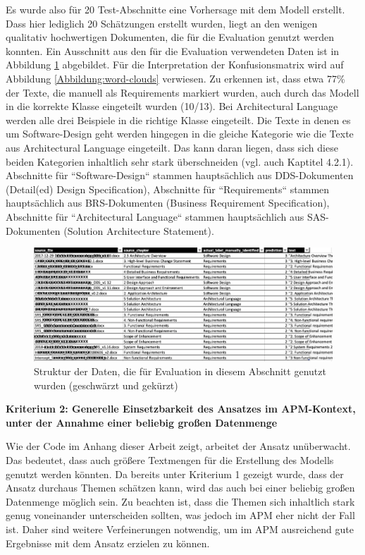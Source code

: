 Es wurde also für 20 Test-Abschnitte eine Vorhersage mit dem Modell erstellt. Dass hier lediglich 20 Schätzungen erstellt wurden, liegt an den wenigen qualitativ hochwertigen Dokumenten, die für die Evaluation genutzt werden konnten. Ein Ausschnitt aus den für die Evaluation verwendeten Daten ist in Abbildung \ref{Abbildung:test-setup} abgebildet. Für die Interpretation der Konfusionsmatrix wird auf Abbildung \ref{Abbildung:word-clouds} verwiesen. Zu erkennen ist, dass etwa 77\% der Texte, die manuell als Requirements markiert wurden, auch durch das Modell in die korrekte Klasse eingeteilt wurden (10/13). Bei Architectural Language werden alle drei Beispiele in die richtige Klasse eingeteilt. Die Texte in denen es um Software-Design geht werden hingegen in die gleiche Kategorie wie die Texte aus Architectural Language eingeteilt. Das kann daran liegen, dass sich diese beiden Kategorien inhaltlich sehr stark überschneiden (vgl. auch Kaptitel 4.2.1). Abschnitte für ``Software-Design`` stammen hauptsächlich aus DDS-Dokumenten (Detail(ed) Design Specification), Abschnitte für ``Requirements`` stammen hauptsächlich aus BRS-Dokumenten (Business Requirement Specification), Abschnitte für ``Architectural Language`` stammen hauptsächlich aus SAS-Dokumenten (Solution Architecture Statement). 

\begin{figure}[h]
\centering
\includegraphics[scale=0.95]{content/pics/Picture_20.png}
\caption{Struktur der Daten, die für Evaluation in diesem Abschnitt genutzt wurden (geschwärzt und gekürzt)}
\label{Abbildung:test-setup}
\end{figure}

{\bf Kriterium 2: Generelle Einsetzbarkeit des Ansatzes im APM-Kontext, unter der Annahme einer beliebig großen Datenmenge}

Wie der Code im Anhang dieser Arbeit zeigt, arbeitet der Ansatz unüberwacht. Das bedeutet, dass auch größere Textmengen für die Erstellung des Modells genutzt werden könnten. Da bereits unter Kriterium 1 gezeigt wurde, dass der Ansatz durchaus Themen schätzen kann, wird das auch bei einer beliebig großen Datenmenge möglich sein. Zu beachten ist, dass die Themen sich inhaltlich stark genug voneinander unterscheiden sollten, was jedoch im APM eher nicht der Fall ist. Daher sind weitere Verfeinerungen notwendig, um im APM ausreichend gute Ergebnisse mit dem Ansatz erzielen zu können.
\\

